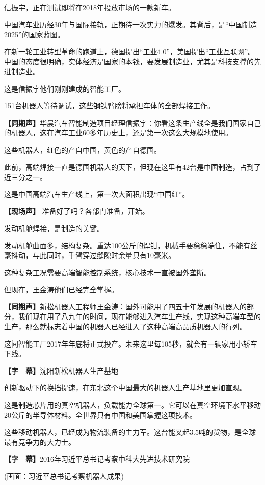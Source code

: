 \documentclass{ctexart}
\newcommand{\zkh}[1]{\textbf{\hspace{-2.7em} 【#1】}}
\begin{document}
 信振宇，正在测试即将在2018年投放市场的一款新车。

中国汽车业历经30年与国际接轨，正期待一次实力的爆发。其背后，是``中国制造2025''的国家蓝图。

在新一轮工业转型革命的跑道上，德国提出``工业4.0''，美国提出``工业互联网''。中国的态度很明确，实体经济是国家的本钱，要发展制造业，尤其是科技支撑的先进制造业。

 这是信振宇他们刚刚建成的智能工厂。

 151台机器人等待调试，这些钢铁臂膀将承担车体的全部焊接工作。

 \zkh{同期声}华晨汽车智能制造项目经理信振宇：你看这条生产线全是我们国家自己的机器人，这在汽车工业60多年历史上，还是第一次这么大规模地使用。

 这些机器人，红色的产自中国，黄色的产自德国。

此前，高端焊接一直是德国机器人的天下，但现在这里有42台是中国制造，占到了近三分之一。

 这是中国高端汽车生产线上，第一次大面积出现``中国红''。

 \zkh{现场声} 准备好了吗？各部门准备，开始。

 发动机舱焊接，是制造的关键。

发动机舱曲面多，结构复杂。重达100公斤的焊钳，机械手要稳稳端住，不能有丝毫抖动，与此同时，手臂穿过缝隙时余量只有10毫米。

 这种复杂工况需要高端智能控制系统，核心技术一直被国外垄断。

 但现在，王金涛他们已经完全掌握。

 \zkh{同期声}新松机器人工程师王金涛：国外可能用了四五十年发展的机器人的部分，我们现在用了八九年的时间，现在能够进入汽车生产线，实现这种高端车型的生产，那么就标志着中国的机器人已经进入了这种高端高品质机器人的行列。

 
这间智能工厂2017年年底将正式投产。未来这里每105秒，就会有一辆家用小轿车下线。

 \zkh{字　幕}沈阳新松机器人生产基地

 
创新驱动下的换挡提速，在东北这个中国最大的机器人生产基地里更加直观。

这是制造芯片用的真空机器人，负载能力全球第一。它可以在真空环境下水平移动20公斤的半导体材料。全世界只有中国和美国掌握这项技术。

这些移动机器人，已经成为物流装备的主力军。这台能叉起3.5吨的货物，是全球最有竞争力的大力士。

 \zkh{字　幕}2016年习近平总书记考察中科大先进技术研究院

 (画面：习近平总书记考察机器人成果)
\end{document}
